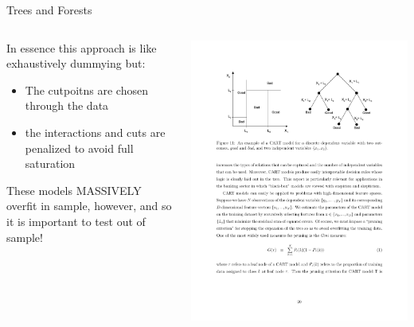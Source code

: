 \documentclass[notes,11pt, aspectratio=169]{beamer}
\newenvironment{wideitemize}{\itemize\addtolength{\itemsep}{10pt}}{\enditemize}
\begin{document}
\begin{frame}{Trees and Forests}
  \begin{columns}[onlytextwidth, T] %
    \begin{column}{.4\textwidth}
      \begin{wideitemize}
      \item In essence this approach is like exhaustively dummying but:
        \begin{itemize}
        \item The cutpoitns are chosen through the data
        \item the interactions and cuts are penalized to avoid full
          saturation
        \end{itemize}
      \item These models MASSIVELY overfit in sample, however, and so
        it is important to test out of sample!
      \end{wideitemize}
      \end{column}%
      \hfill%
      \begin{column}{.6\textwidth}
        \includegraphics[width=\linewidth]{images/Tree_Lo.pdf}
      \end{column}%
    \end{columns}
\end{frame}
\end{document}
